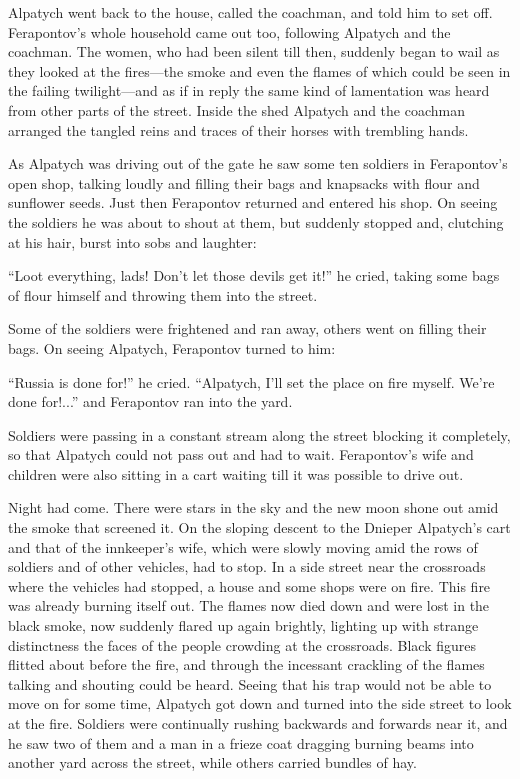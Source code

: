 Alpatych went back to the house, called the coachman, and told
him to set off. Ferapontov's whole household came out too,
following Alpatych and the coachman. The women, who had been
silent till then, suddenly began to wail as they looked at the
fires---the smoke and even the flames of which could be seen in
the failing twilight---and as if in reply the same kind of
lamentation was heard from other parts of the street.  Inside the
shed Alpatych and the coachman arranged the tangled reins and
traces of their horses with trembling hands.

As Alpatych was driving out of the gate he saw some ten soldiers
in Ferapontov's open shop, talking loudly and filling their bags
and knapsacks with flour and sunflower seeds. Just then
Ferapontov returned and entered his shop. On seeing the soldiers
he was about to shout at them, but suddenly stopped and,
clutching at his hair, burst into sobs and laughter:

``Loot everything, lads! Don't let those devils get it!'' he
cried, taking some bags of flour himself and throwing them into
the street.

Some of the soldiers were frightened and ran away, others went on
filling their bags. On seeing Alpatych, Ferapontov turned to him:

``Russia is done for!'' he cried. ``Alpatych, I'll set the place
on fire myself. We're done for!...'' and Ferapontov ran into the
yard.

Soldiers were passing in a constant stream along the street
blocking it completely, so that Alpatych could not pass out and
had to wait.  Ferapontov's wife and children were also sitting in
a cart waiting till it was possible to drive out.

Night had come. There were stars in the sky and the new moon
shone out amid the smoke that screened it. On the sloping descent
to the Dnieper Alpatych's cart and that of the innkeeper's wife,
which were slowly moving amid the rows of soldiers and of other
vehicles, had to stop. In a side street near the crossroads where
the vehicles had stopped, a house and some shops were on
fire. This fire was already burning itself out. The flames now
died down and were lost in the black smoke, now suddenly flared
up again brightly, lighting up with strange distinctness the
faces of the people crowding at the crossroads. Black figures
flitted about before the fire, and through the incessant
crackling of the flames talking and shouting could be
heard. Seeing that his trap would not be able to move on for some
time, Alpatych got down and turned into the side street to look
at the fire. Soldiers were continually rushing backwards and
forwards near it, and he saw two of them and a man in a frieze
coat dragging burning beams into another yard across the street,
while others carried bundles of hay.

